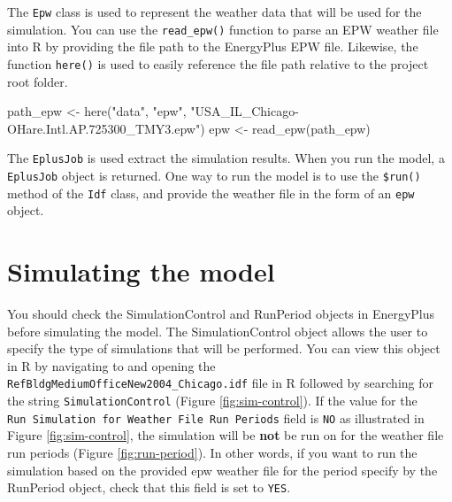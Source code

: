 \documentclass[
]{book}
\newenvironment{Shaded}{\begin{snugshade}}{\end{snugshade}}
\newcommand{\AttributeTok}[1]{\textcolor[rgb]{0.77,0.63,0.00}{#1}}
\newcommand{\FunctionTok}[1]{\textcolor[rgb]{0.00,0.00,0.00}{#1}}
\newcommand{\NormalTok}[1]{#1}
\newcommand{\OtherTok}[1]{\textcolor[rgb]{0.56,0.35,0.01}{#1}}
\newcommand{\SpecialCharTok}[1]{\textcolor[rgb]{0.00,0.00,0.00}{#1}}
\newcommand{\StringTok}[1]{\textcolor[rgb]{0.31,0.60,0.02}{#1}}
\begin{document}
The \texttt{Epw} class is used to represent the weather data that will be used for the simulation. You can use the \texttt{read\_epw()} function to parse an EPW weather file into R by providing the file path to the EnergyPlus EPW file. Likewise, the function \texttt{here()} is used to easily reference the file path relative to the project root folder.

\begin{Shaded}
\begin{Highlighting}[]
\NormalTok{path\_epw }\OtherTok{\textless{}{-}} \FunctionTok{here}\NormalTok{(}\StringTok{"data"}\NormalTok{, }\StringTok{"epw"}\NormalTok{, }\StringTok{"USA\_IL\_Chicago{-}OHare.Intl.AP.725300\_TMY3.epw"}\NormalTok{)}
\NormalTok{epw }\OtherTok{\textless{}{-}} \FunctionTok{read\_epw}\NormalTok{(path\_epw)}
\end{Highlighting}
\end{Shaded}

The \texttt{EplusJob} is used extract the simulation results. When you run the model, a \texttt{EplusJob} object is returned. One way to run the model is to use the \texttt{\$run()} method of the \texttt{Idf} class, and provide the weather file in the form of an \texttt{epw} object.

\begin{Shaded}
\end{Shaded}

\hypertarget{simulating-the-model}{%
\section{Simulating the model}\label{simulating-the-model}}

You should check the SimulationControl and RunPeriod objects in EnergyPlus before simulating the model. The SimulationControl object allows the user to specify the type of simulations that will be performed. You can view this object in R by navigating to and opening the \texttt{RefBldgMediumOfficeNew2004\_Chicago.idf} file in R followed by searching for the string \texttt{SimulationControl} (Figure \ref{fig:sim-control}). If the value for the \texttt{Run\ Simulation\ for\ Weather\ File\ Run\ Periods} field is \texttt{NO} as illustrated in Figure \ref{fig:sim-control}, the simulation will be \textbf{not} be run on for the weather file run periods (Figure \ref{fig:run-period}). In other words, if you want to run the simulation based on the provided epw weather file for the period specify by the RunPeriod object, check that this field is set to \texttt{YES}.
\end{document}
